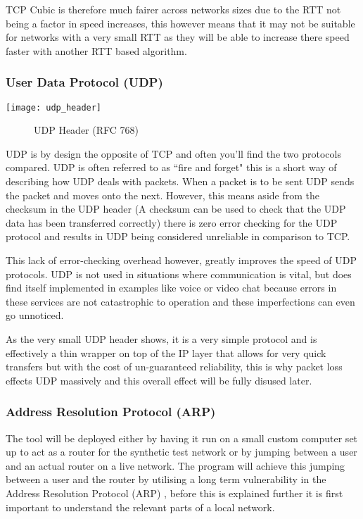 TCP Cubic is therefore much fairer across networks sizes due to the RTT not being a factor in speed increases, this however means that it may not be suitable for networks with a very small RTT as they will be able to increase there speed faster with another RTT based algorithm.



\clearpage
\subsubsection{User Data Protocol (UDP)}
\begin{center}
	\texttt{[image: udp\_header]}
	\begin{figure}[h]
		\caption{UDP Header (RFC 768)}
	\end{figure}		
\end{center}

UDP is by design the opposite of TCP and often you'll find the two protocols compared. UDP is often referred to as ``fire and forget" \citep{kempf2011thoughts} this is a short way of describing how UDP deals with packets. When a packet is to be sent UDP sends the packet and moves onto the next. However, this means aside from the checksum in the UDP header (A checksum can be used to check that the UDP data has been transferred correctly) there is zero error checking for the UDP protocol and results in UDP being considered unreliable in comparison to TCP. 

This lack of error-checking overhead however, greatly improves the speed of UDP protocols. UDP is not used in situations where communication is vital, but does find itself implemented in examples like voice or video chat because errors in these services are not catastrophic to operation and these imperfections can even go unnoticed.

As the very small UDP header shows, it is a very simple protocol and is effectively a thin wrapper on top of the IP layer that allows for very quick transfers but with the cost of un-guaranteed reliability, this is why packet loss effects UDP massively and this overall effect will be fully disused later.

\clearpage
\subsubsection{Address Resolution Protocol (ARP)}
The tool will be deployed either by having it run on a small custom computer set up to act as a router for the synthetic test network or by jumping between a user and an actual router on a live network. The program will achieve this jumping between a user and the router by utilising a long term vulnerability in the Address Resolution Protocol (ARP) \citep{arp2001}, before this is explained further it is first important to understand the relevant parts of a local network.

